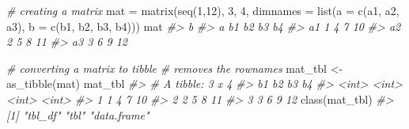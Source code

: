 \documentclass[
]{book}
\newenvironment{Shaded}{\begin{snugshade}}{\end{snugshade}}
\newcommand{\AttributeTok}[1]{\textcolor[rgb]{0.77,0.63,0.00}{#1}}
\newcommand{\CommentTok}[1]{\textcolor[rgb]{0.56,0.35,0.01}{\textit{#1}}}
\newcommand{\DecValTok}[1]{\textcolor[rgb]{0.00,0.00,0.81}{#1}}
\newcommand{\FunctionTok}[1]{\textcolor[rgb]{0.00,0.00,0.00}{#1}}
\newcommand{\NormalTok}[1]{#1}
\newcommand{\OtherTok}[1]{\textcolor[rgb]{0.56,0.35,0.01}{#1}}
\newcommand{\StringTok}[1]{\textcolor[rgb]{0.31,0.60,0.02}{#1}}
\begin{document}
\begin{Shaded}
\begin{Highlighting}[]
\CommentTok{\# creating a matrix}
\NormalTok{mat }\OtherTok{=} \FunctionTok{matrix}\NormalTok{(}\FunctionTok{seq}\NormalTok{(}\DecValTok{1}\NormalTok{,}\DecValTok{12}\NormalTok{), }\DecValTok{3}\NormalTok{, }\DecValTok{4}\NormalTok{, }
             \AttributeTok{dimnames =} \FunctionTok{list}\NormalTok{(}\StringTok{\textquotesingle{}a\textquotesingle{}} \OtherTok{=} \FunctionTok{c}\NormalTok{(}\StringTok{\textquotesingle{}a1\textquotesingle{}}\NormalTok{, }\StringTok{\textquotesingle{}a2\textquotesingle{}}\NormalTok{, }\StringTok{\textquotesingle{}a3\textquotesingle{}}\NormalTok{), }\StringTok{\textquotesingle{}b\textquotesingle{}} \OtherTok{=} \FunctionTok{c}\NormalTok{(}\StringTok{\textquotesingle{}b1\textquotesingle{}}\NormalTok{, }\StringTok{\textquotesingle{}b2\textquotesingle{}}\NormalTok{, }\StringTok{\textquotesingle{}b3\textquotesingle{}}\NormalTok{, }\StringTok{\textquotesingle{}b4\textquotesingle{}}\NormalTok{)))}
\NormalTok{mat}
\CommentTok{\#\textgreater{}     b}
\CommentTok{\#\textgreater{} a    b1 b2 b3 b4}
\CommentTok{\#\textgreater{}   a1  1  4  7 10}
\CommentTok{\#\textgreater{}   a2  2  5  8 11}
\CommentTok{\#\textgreater{}   a3  3  6  9 12}

\CommentTok{\# converting a matrix to tibble}
\CommentTok{\# removes the rownames}
\NormalTok{mat\_tbl }\OtherTok{\textless{}{-}} \FunctionTok{as\_tibble}\NormalTok{(mat)}
\NormalTok{mat\_tbl}
\CommentTok{\#\textgreater{} \# A tibble: 3 x 4}
\CommentTok{\#\textgreater{}      b1    b2    b3    b4}
\CommentTok{\#\textgreater{}   \textless{}int\textgreater{} \textless{}int\textgreater{} \textless{}int\textgreater{} \textless{}int\textgreater{}}
\CommentTok{\#\textgreater{} 1     1     4     7    10}
\CommentTok{\#\textgreater{} 2     2     5     8    11}
\CommentTok{\#\textgreater{} 3     3     6     9    12}
\FunctionTok{class}\NormalTok{(mat\_tbl)}
\CommentTok{\#\textgreater{} [1] "tbl\_df"     "tbl"        "data.frame"}


\end{Highlighting}
\end{Shaded}
\end{document}
